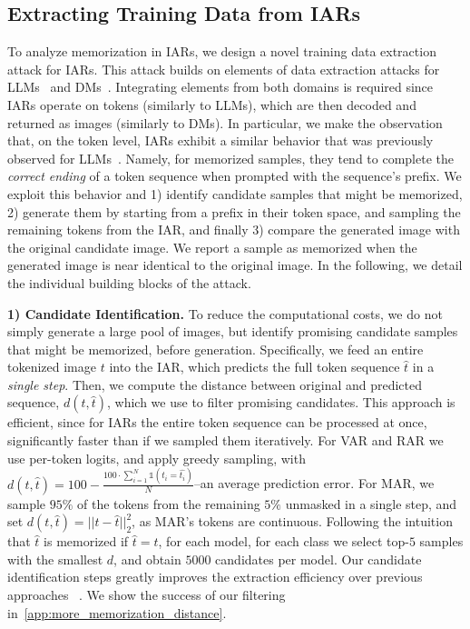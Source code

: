 \subsection{Extracting Training Data from IARs}
\label{sec:memorization}

To analyze memorization in IARs, we design a novel training data extraction attack for IARs.
This attack builds on elements of data extraction attacks for LLMs~\citep{carlini2021extractLLM} and DMs~\citep{carlini2023extracting}. 
Integrating elements from both domains is required since IARs operate on tokens (similarly to LLMs), which are then decoded and returned as images (similarly to DMs).
In particular, we make the observation that, on the token level, IARs exhibit a similar behavior that was previously observed for LLMs~\citep{carlini2021extractLLM}.
Namely, for memorized samples, they tend to complete the \textit{correct ending} of a token sequence when prompted with the sequence's prefix.
We exploit this behavior and 1) identify candidate samples that might be memorized, 2) generate them by starting from a prefix in their token space, and sampling the remaining tokens from the IAR, and finally 3) compare the generated image with the original candidate image.
We report a sample as memorized when the generated image is near identical to the original image.
In the following, we detail the individual building blocks of the attack.



\textbf{1) Candidate Identification.} 
To reduce the computational costs, we do not simply generate a large pool of images, but identify promising candidate samples that might be memorized, before generation.
Specifically, we feed an entire tokenized image $t$ into the IAR, which predicts the full token sequence $\hat{t}$ in a \textit{single step}. Then, we compute the distance between original and predicted sequence, $d(t,\hat{t})$, which we use to filter promising candidates.
This approach is efficient, since for IARs the entire token sequence can be processed at once, significantly faster than if we sampled them iteratively. For VAR and RAR we use per-token logits, and apply greedy sampling, with $d(t,\hat{t})=100-\frac{100\cdot\sum_{i=1}^{N}\mathbb{1}\left(t_i=\hat{t_i}\right)}{N}$--an average prediction error. 
For MAR, we sample $95\%$ of the tokens from the remaining $5\%$ unmasked in a single step, and set $d(t,\hat{t})=||t-\hat{t}||^2_2$, as MAR's tokens are continuous. 
Following the intuition that $\hat{t}$ is memorized if $\hat{t}=t$, for each model, for each class we select top-$5$ samples with the smallest $d$, and obtain $5000$ candidates per model. Our candidate identification steps greatly improves the extraction efficiency over previous approaches ~\cite{carlini2023extracting}.
We show the success of our filtering in~\cref{app:more_memorization_distance}.





